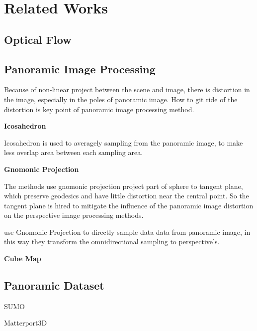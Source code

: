 
\chapter{Related Works}

\section{Optical Flow}


\section{Panoramic Image Processing}

Because of non-linear project between the scene and image, there is distortion in the image, especially in the poles of panoramic image.
How to git ride of the distortion is key point of panoramic image processing method. 

\textbf{Icosahedron}

Icosahedron is used to averagely sampling from the panoramic image, to make less overlap area between each sampling area.

\citet{eder2019mapped}





\textbf{Gnomonic Projection} ~\citet{gnomonicprojection}

The methods use gnomonic projection project part of sphere to tangent plane, which preserve geodesics and have little distortion near the central point.
So the tangent plane is hired to mitigate the influence of the panoramic image  distortion on the perspective image processing methods.

\citet{coors2018spherenet} use Gnomonic Projection to directly sample data data from panoramic image, in this way they transform the omnidirectional sampling to perspective's.

\textbf{Cube Map}


\section{Panoramic Dataset}




SUMO

Matterport3D





